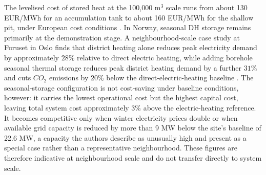 The levelised cost of stored heat at the 100,000 m$^3$ scale runs from about 130 EUR/MWh for an accumulation tank to about 160 EUR/MWh for the shallow pit, under European cost conditions \cite{dahash_techno-economic_2021}. In Norway, seasonal DH storage remains primarily at the demonstration stage. A neighbourhood-scale case study at Furuset in Oslo finds that district heating alone reduces peak electricity demand by approximately $28\%$ relative to direct electric heating, while adding borehole seasonal thermal storage reduces peak district heating demand by a further $31\%$ and cuts $CO_2$ emissions by $20\%$ below the direct-electric-heating baseline \cite{kauko_assessing_2022}. The seasonal-storage configuration is not cost-saving under baseline conditions, however: it carries the lowest operational cost but the highest capital cost, leaving total system cost approximately $3\%$ above the electric-heating reference. It becomes competitive only when winter electricity prices double or when available grid capacity is reduced by more than 9 MW below the site's baseline of 22.6 MW, a capacity the authors describe as unusually high and present as a special case rather than a representative neighbourhood. These figures are therefore indicative at neighbourhood scale and do not transfer directly to system scale. 

